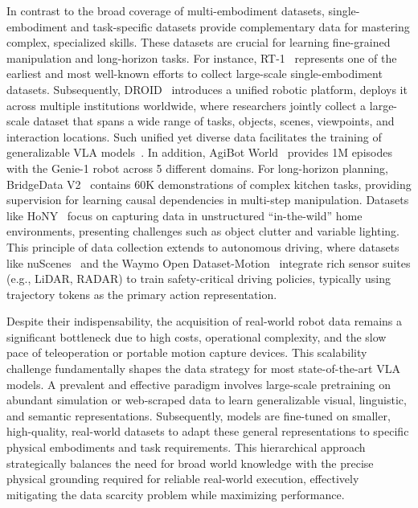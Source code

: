 \documentclass[10pt, a4paper, logo, copyright]{googledeepmind} %
\begin{document}
In contrast to the broad coverage of multi-embodiment datasets, single-embodiment and task-specific datasets provide complementary data for mastering complex, specialized skills. These datasets are crucial for learning fine-grained manipulation and long-horizon tasks. 
For instance, RT-1~\cite{Brohan2022RT1RT} represents one of the earliest and most well-known efforts to collect large-scale single-embodiment datasets.
Subsequently, DROID~\cite{khazatsky2025droidlargescaleinthewildrobot} introduces a unified robotic platform, deploys it across multiple institutions worldwide, where researchers jointly collect a large-scale dataset that spans a wide range of tasks, objects, scenes, viewpoints, and interaction locations. Such unified yet diverse data facilitates the training of generalizable VLA models~\cite{Pi0-FAST}.
In addition, AgiBot World~\cite{contributors2024agibotworldrepo} provides 1M episodes with the Genie-1 robot across 5 different domains. 
For long-horizon planning, BridgeData V2~\cite{walke2024bridgedatav2datasetrobot} contains 60K demonstrations of complex kitchen tasks, providing supervision for learning causal dependencies in multi-step manipulation. 
Datasets like HoNY~\cite{shafiullah2023bringing} focus on capturing data in unstructured ``in-the-wild'' home environments, presenting challenges such as object clutter and variable lighting. This principle of data collection extends to autonomous driving, where datasets like nuScenes~\cite{fong2021panoptic} and the Waymo Open Dataset-Motion~\cite{Ettinger_2021_ICCV, Kan_2024_icra} integrate rich sensor suites (e.g., LiDAR, RADAR) to train safety-critical driving policies, typically using trajectory tokens as the primary action representation. 

Despite their indispensability, the acquisition of real-world robot data remains a significant bottleneck due to high costs, operational complexity, and the slow pace of teleoperation or portable motion capture devices. This scalability challenge fundamentally shapes the data strategy for most state-of-the-art VLA models. A prevalent and effective paradigm involves large-scale pretraining on abundant simulation or web-scraped data to learn generalizable visual, linguistic, and semantic representations. Subsequently, models are fine-tuned on smaller, high-quality, real-world datasets to adapt these general representations to specific physical embodiments and task requirements. This hierarchical approach strategically balances the need for broad world knowledge with the precise physical grounding required for reliable real-world execution, effectively mitigating the data scarcity problem while maximizing performance.
\end{document}
